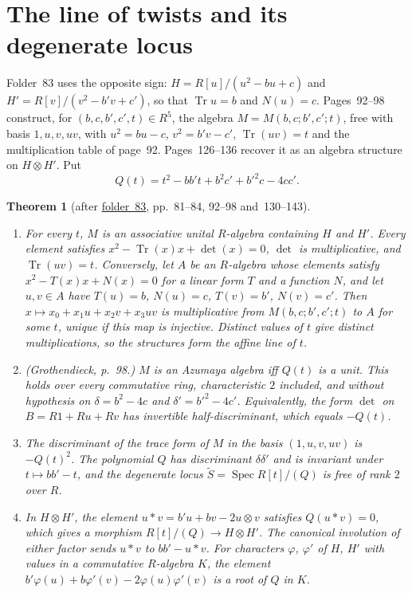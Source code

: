 \documentclass[11pt,a4paper]{amsart}
\newtheorem{theorem}{Theorem}[section]
\theoremstyle{definition}
\theoremstyle{remark}
\newcommand{\Tr}{\operatorname{Tr}}
\newcommand{\fac}[1]{\href{https://grothendieck.umontpellier.fr/#1.pdf}{folder~#1}}
\begin{document}
\section{The line of twists and its degenerate locus}\label{sec:twist}

Folder~83 uses the opposite sign: $H = R[u]/(u^2 - bu + c)$ and $H' = R[v]/(v^2 - b'v + c')$, so that $\Tr u = b$ and $N(u) = c$. Pages~92--98 construct, for $(b, c, b', c', t) \in R^5$, the algebra $M = M(b, c; b', c'; t)$, free with basis $1, u, v, uv$, with $u^2 = bu - c$, $v^2 = b'v - c'$, $\Tr(uv) = t$ and the multiplication table of page~92. Pages~126--136 recover it as an algebra structure on $H \otimes H'$. Put
\[
Q(t) = t^2 - bb't + b^2c' + b'^2c - 4cc'.
\]

\begin{theorem}[after \fac{83}, pp.~81--84, 92--98 and~130--143]\label{thm:twist}
\leavevmode
\begin{enumerate}
\item For every $t$, $M$ is an associative unital $R$-algebra containing $H$ and $H'$. Every element satisfies $x^2 - \Tr(x)x + \det(x) = 0$, $\det$ is multiplicative, and $\Tr(uv) = t$. Conversely, let $A$ be an $R$-algebra whose elements satisfy $x^2 - T(x)x + N(x) = 0$ for a linear form $T$ and a function $N$, and let $u, v \in A$ have $T(u) = b$, $N(u) = c$, $T(v) = b'$, $N(v) = c'$. Then $x \mapsto x_0 + x_1u + x_2v + x_3uv$ is multiplicative from $M(b, c; b', c'; t)$ to $A$ for some $t$, unique if this map is injective. Distinct values of $t$ give distinct multiplications, so the structures form the affine line of $t$.
\item \emph{(Grothendieck, p.~98.)} $M$ is an Azumaya algebra iff $Q(t)$ is a unit. This holds over every commutative ring, characteristic $2$ included, and without hypothesis on $\delta = b^2 - 4c$ and $\delta' = b'^2 - 4c'$. Equivalently, the form $\det$ on $B = R1 + Ru + Rv$ has invertible half-discriminant, which equals $-Q(t)$.
\item The discriminant of the trace form of $M$ in the basis $(1, u, v, uv)$ is $-Q(t)^2$. The polynomial $Q$ has discriminant $\delta\delta'$ and is invariant under $t \mapsto bb' - t$, and the degenerate locus $\widetilde S = \operatorname{Spec} R[t]/(Q)$ is free of rank $2$ over $R$.
\item In $H \otimes H'$, the element $u * v = b'u + bv - 2u \otimes v$ satisfies $Q(u * v) = 0$, which gives a morphism $R[t]/(Q) \to H \otimes H'$. The canonical involution of either factor sends $u * v$ to $bb' - u * v$. For characters $\varphi$, $\varphi'$ of $H$, $H'$ with values in a commutative $R$-algebra $K$, the element $b'\varphi(u) + b\varphi'(v) - 2\varphi(u)\varphi'(v)$ is a root of $Q$ in $K$.
\end{enumerate}
\end{theorem}
\end{document}
